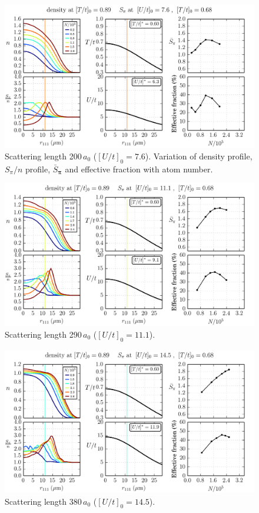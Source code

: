 \documentclass[11pt,letter]{article}
\newcommand{\bv}[1]{\ensuremath{\bm{#1}}}
\begin{document}
\begin{figure}
    \centering
\includegraphics[width=\textwidth]{figures/200a0_cold.png}
\caption{Scattering length 200\,$a_{0}$ ($[U/t]_{0}=7.6$).  Variation of
density profile, $S_{\pi}/n$ profile,  $\bar{S}_{\bv{\pi}}$  and effective
fraction with atom number. } 
\label{fig:200a0_varyN}
\end{figure}

\begin{figure}
    \centering
\includegraphics[width=\textwidth]{figures/290a0_cold.png}
\caption{Scattering length 290\,$a_{0}$ ($[U/t]_{0}=11.1$).   } 
\label{fig:290a0_varyN}
\end{figure}

\begin{figure}
    \centering
\includegraphics[width=\textwidth]{figures/380a0_cold.png}
\caption{Scattering length 380\,$a_{0}$ ($[U/t]_{0}=14.5$).   } 
\label{fig:380a0_varyN}
\end{figure}
\end{document}
